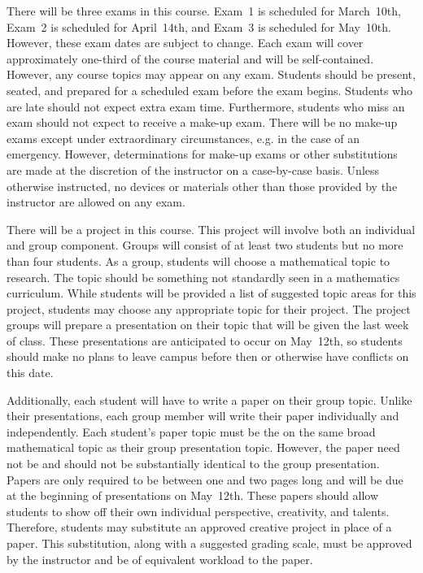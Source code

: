 \documentclass[11pt,letterpaper]{article}
\begin{document}
There will be three exams in this course. Exam~1 is scheduled for March~10th, Exam~2 is scheduled for April~14th, and Exam~3 is scheduled for May~10th. However, these exam dates are subject to change. Each exam will cover approximately one-third of the course material and will be self-contained. However, any course topics may appear on any exam. Students should be present, seated, and prepared for a scheduled exam before the exam begins. Students who are late should not expect extra exam time. Furthermore, students who miss an exam should not expect to receive a make-up exam. There will be no make-up exams except under extraordinary circumstances, e.g. in the case of an emergency. However, determinations for make-up exams or other substitutions are made at the discretion of the instructor on a case-by-case basis. Unless otherwise instructed, no devices or materials other than those provided by the instructor are allowed on any exam. 
\sectionbreak



There will be a project in this course. This project will involve both an individual and group component. Groups will consist of at least two students but no more than four students. As a group, students will choose a mathematical topic to research. The topic should be something not standardly seen in a mathematics curriculum. While students will be provided a list of suggested topic areas for this project, students may choose any appropriate topic for their project. The project groups will prepare a presentation on their topic that will be given the last week of class. These presentations are anticipated to occur on May~12th, so students should make no plans to leave campus before then or otherwise have conflicts on this date. \pspace

Additionally, each student will have to write a paper on their group topic. Unlike their presentations, each group member will write their paper individually and independently. Each student's paper topic must be the on the same broad mathematical topic as their group presentation topic. However, the paper need not be and should not be substantially identical to the group presentation. Papers are only required to be between one and two pages long and will be due at the beginning of presentations on May~12th. These papers should allow students to show off their own individual perspective, creativity, and talents. Therefore, students may substitute an approved creative project in place of a paper. This substitution, along with a suggested grading scale, must be approved by the instructor and be of equivalent workload to the paper. 
\sectionbreak
 
\end{document}
